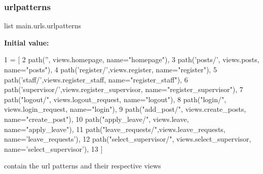 \subsubsection{\texorpdfstring{urlpatterns}{urlpatterns}}
{\footnotesize\ttfamily list main.\+urls.\+urlpatterns}

{\bfseries Initial value\+:}
\begin{DoxyCode}
1 =  [
2     path(\textcolor{stringliteral}{''}, views.homepage, name=\textcolor{stringliteral}{"homepage"}),
3     path(\textcolor{stringliteral}{'posts/'}, views.posts, name=\textcolor{stringliteral}{"posts"}),
4     path(\textcolor{stringliteral}{'register/'},views.register, name=\textcolor{stringliteral}{"register"}),
5     path(\textcolor{stringliteral}{'staff/'},views.register\_staff, name=\textcolor{stringliteral}{"register\_staff"}),
6     path(\textcolor{stringliteral}{'supervisor/'},views.register\_supervisor, name=\textcolor{stringliteral}{"register\_supervisor"}),
7     path(\textcolor{stringliteral}{"logout/"}, views.logout\_request, name=\textcolor{stringliteral}{"logout"}),
8     path(\textcolor{stringliteral}{"login/"}, views.login\_request, name=\textcolor{stringliteral}{"login"}),
9     path(\textcolor{stringliteral}{"add\_post/"}, views.create\_posts, name=\textcolor{stringliteral}{"create\_post"}),
10     path(\textcolor{stringliteral}{"apply\_leave/"}, views.leave, name=\textcolor{stringliteral}{"apply\_leave"}),
11     path(\textcolor{stringliteral}{"leave\_requests/"},views.leave\_requests, name=\textcolor{stringliteral}{'leave\_requests'}),
12     path(\textcolor{stringliteral}{"select\_supervisor/"}, views.select\_supervisor, name=\textcolor{stringliteral}{'select\_supervisor'}),
13 ]
\end{DoxyCode}


contain the url patterns and their respective views 

